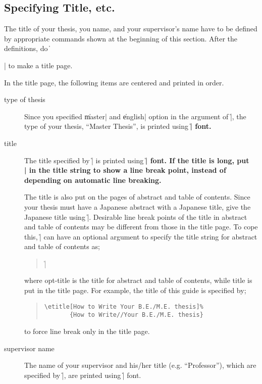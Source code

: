 \subsection{Specifying Title, etc.}\label{appsub-title}
The title of your thesis, you name, and your supervisor's name have to be
defined by appropriate commands shown at the beginning of this section.
After the definitions, do \|\maketitle| to make a title page.

In the title page, the following items are centered and printed in order.
\begin{description}%
\item[type of thesis]
Since you specified \|master| and \|english| option in the argument of
\|\documentstyle|, the type of your thesis, ``Master Thesis'', is printed
using \|\Large\bf| font.

\item[title]
The title specified by \|\etitle| is printed using \|\LARGE\bf| font.  If
the title is long, put \|\\| in the title string to show a line break point,
instead of depending on automatic line breaking.

The title is also put on the pages of abstract and table of contents.  Since
your thesis must have a Japanese abstract with a Japanese title, give the
Japanese title using \|\jtitle|.  Desirable line break points of the title
in abstract and table of contents may be different from those in the title
page.  To cope this, \|\etitle| can have an optional argument to specify the
title string for abstract and table of contents as;
\begin{quote}%
\||
\end{quote}%
where \<opt-title\> is the title for abstract and table of contents, while
\<title\> is put in the title page.  For example, the title of this guide is
specified by;
\begin{quote}\begin{verbatim}
\etitle[How to Write Your B.E./M.E. thesis]%
       {How to Write//Your B.E./M.E. thesis}
\end{verbatim}\end{quote}
to force line break only in the title page.

\item[supervisor name]
The name of your supervisor and his/her title (e.g. ``Professor''), which
are specified by \|\supervisor|, are printed using \|\large| font.


\end{description}
